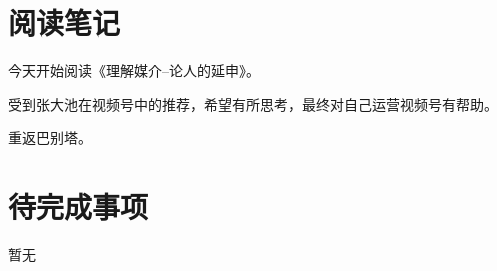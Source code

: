 \documentclass[UTF8]{ctexart}
\date{\today}
\author{陈诗}
\begin{document}
    
\section{阅读笔记}
今天开始阅读《理解媒介--论人的延申》。

受到张大池在视频号中的推荐，希望有所思考，最终对自己运营视频号有帮助。

重返巴别塔。



\section{待完成事项}
暂无
\end{document}

